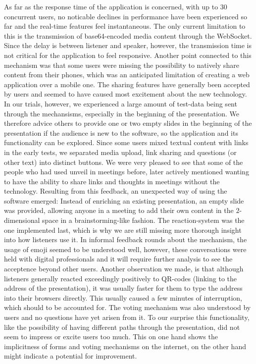 As far as the response time of the application is concerned, with up to 30 concurrent users, no noticable declines in performance have been experienced so far and the real-time features feel instantaneous. The only current limitation to this is the transmission of base64-encoded media content through the WebSocket. Since the delay is between listener and speaker, however, the transmission time is not critical for the application to feel responsive. Another point connected to this mechanism was that some users were missing the possibility to natively share content from their phones, which was an anticipated limitation of creating a web application over a mobile one.
The sharing features have generally been accepted by users and seemed to have caused most excitement about the new technology. In our trials, however, we experienced a large amount of test-data being sent through the mechansisms, especially in the beginning of the presentation. We therefore advice others to provide one or two empty slides in the beginning of the presentation if the audience is new to the software, so the application and its functionality can be explored. Since some users mixed textual content with links in the early tests, we separated media upload, link sharing and questions (or other text) into distinct buttons. We were very pleased to see that some of the people who had used unveil in meetings before, later actively mentioned wanting to have the ability to share links and thoughts in meetings without the technology. Resulting from this feedback, an unexpected way of using the software emerged: Instead of enriching an existing presentation, an empty slide was provided, allowing anyone in a meeting to add their own content in the $2$-dimensional space in a brainstorming-like fashion.
The reaction-system was the one implemented last, which is why we are still missing more thorough insight into how listeners use it. In informal feedback rounds about the mechanism, the usage of emoji seemed to be understood well, however, these conversations were held with digital professionals and it will require further analysis to see the acceptence beyond other users. Another observation we made, is that although listeners generally reacted exceedingly positively to QR-codes (linking to the address of the presentation), it was usually faster for them to type the address into their browsers directly. This usually caused a few minutes of interruption, which should to be accounted for.
The voting mechanism was also understood by users and no questions have yet arisen from it. To our surprise this functionality, like the possibility of having different paths through the presentation, did not seem to impress or excite users too much. This on one hand shows the implicitness of forms and voting mechanisms on the internet, on the other hand might indicate a potential for improvement.

